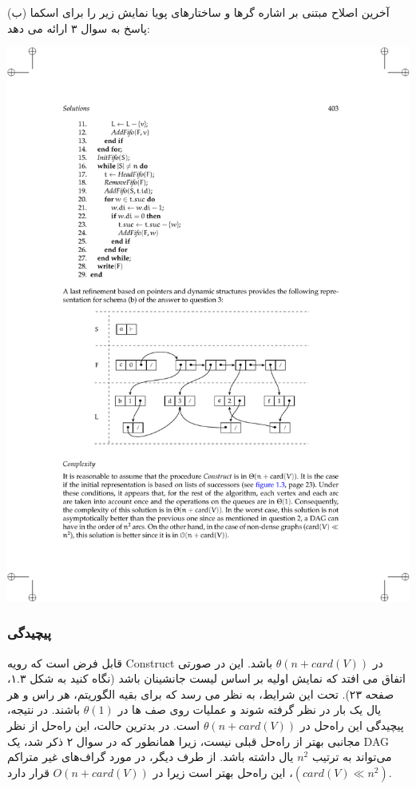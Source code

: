 \documentclass{book} %
\newcommand{\imgcaption}[1]{\color[HTML]{4F4D4D}\footnotesize{#1}}
\begin{document}
آخرین اصلاح مبتنی بر اشاره گرها و ساختارهای پویا نمایش زیر را برای اسکما (ب) پاسخ به سوال ۳ ارائه می دهد:

\begin{center}
    \includegraphics{./f3.pdf}

\end{center}

\subsubsection*{پیچیدگی}

قابل فرض است که رویه Construct در $\theta (n + card(V))$ باشد. این در صورتی اتفاق می افتد که نمایش اولیه بر اساس لیست جانشینان باشد (نگاه کنید به شکل ۱.۳، صفحه ۲۳). تحت این شرایط، به نظر می رسد که برای بقیه الگوریتم، هر راس و هر یال یک بار در نظر گرفته شوند و عملیات روی صف ها در $\theta (1)$ باشند. در نتیجه، پیچیدگی این راه‌حل در $\theta (n + card(V))$ است. در بدترین حالت، این راه‌حل از نظر مجانبی بهتر از راه‌حل قبلی نیست، زیرا همانطور که در سوال ۲ ذکر شد، یک DAG می‌تواند به ترتیب $n^2$ یال داشته باشد. از طرف دیگر، در مورد گراف‌های غیر متراکم $(card(V) ≪ n^2)$، این راه‌حل بهتر است زیرا در $O(n + card(V))$ قرار دارد.
\end{document}

